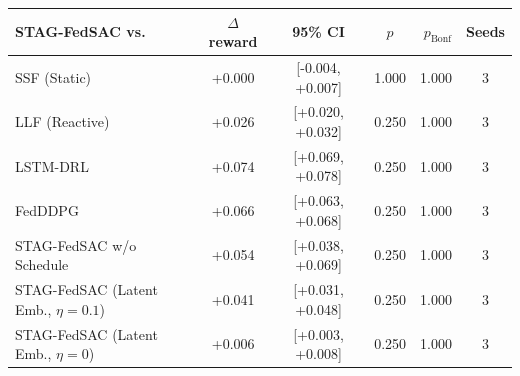 \begin{tabular}{lcccrc}
\toprule
STAG-FedSAC vs. & $\Delta$ reward & 95\% CI & $p$ & $p_{\text{Bonf}}$ & Seeds \\
\midrule
SSF (Static) & +0.000 & [-0.004, +0.007] & 1.000 & 1.000 & 3 \\
LLF (Reactive) & +0.026 & [+0.020, +0.032] & 0.250 & 1.000 & 3 \\
LSTM-DRL & +0.074 & [+0.069, +0.078] & 0.250 & 1.000 & 3 \\
FedDDPG & +0.066 & [+0.063, +0.068] & 0.250 & 1.000 & 3 \\
STAG-FedSAC w/o Schedule & +0.054 & [+0.038, +0.069] & 0.250 & 1.000 & 3 \\
STAG-FedSAC (Latent Emb., $\eta{=}0.1$) & +0.041 & [+0.031, +0.048] & 0.250 & 1.000 & 3 \\
STAG-FedSAC (Latent Emb., $\eta{=}0$) & +0.006 & [+0.003, +0.008] & 0.250 & 1.000 & 3 \\
\bottomrule
\end{tabular}
